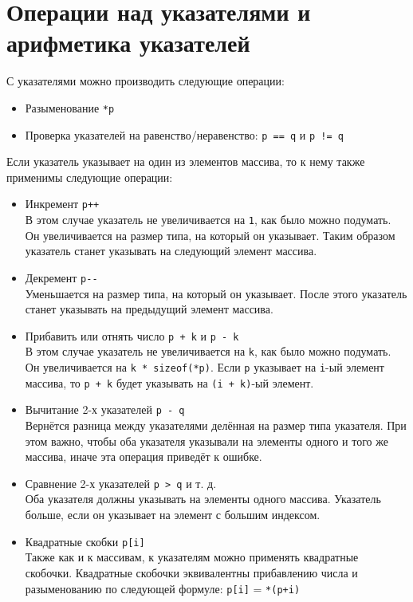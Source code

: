 \documentclass[10pt]{article}
\begin{document}
\section*{Операции над указателями и арифметика указателей}
С указателями можно производить следующие операции:
\begin{itemize}
\item Разыменование \texttt{*p}
\item Проверка указателей на равенство/неравенство: \texttt{p == q} и \texttt{p != q}
\end{itemize}
Если указатель указывает на один из элементов массива, то к нему также применимы следующие операции:
\begin{itemize}
\item Инкремент \texttt{p++}\\
В этом случае указатель не увеличивается на \texttt{1}, как было можно подумать. Он увеличивается на размер типа, на который он указывает. Таким образом указатель станет указывать на следующий элемент массива.

\item Декремент \texttt{p-{}-}\\
Уменьшается на размер типа, на который он указывает. После этого указатель станет указывать на предыдущий элемент массива.

\item Прибавить или отнять число \texttt{p + k} и \texttt{p - k}\\
В этом случае указатель не увеличивается на \texttt{k}, как было можно подумать. Он увеличивается на \texttt{k * sizeof(*p)}. Если \texttt{p} указывает на \texttt{i}-ый элемент массива, то \texttt{p + k} будет указывать на \texttt{(i + k)}-ый элемент.

\item Вычитание 2-х указателей \texttt{p - q}\\
Вернётся разница между указателями делённая на размер типа указателя.
При этом важно, чтобы оба указателя указывали на элементы одного и того же массива, иначе эта операция приведёт к ошибке.

\item Сравнение 2-х указателей \texttt{p > q} и т. д.\\
Оба указателя должны указывать на элементы одного массива. Указатель больше, если он указывает на элемент с большим индексом.

\item Квадратные скобки \texttt{p[i]}\\
Также как и к массивам, к указателям можно применять квадратные скобочки. Квадратные скобочки эквивалентны прибавлению числа и разыменованию по следующей формуле: \texttt{p[i]} = \texttt{*(p+i)}
\end{itemize}
\end{document}
